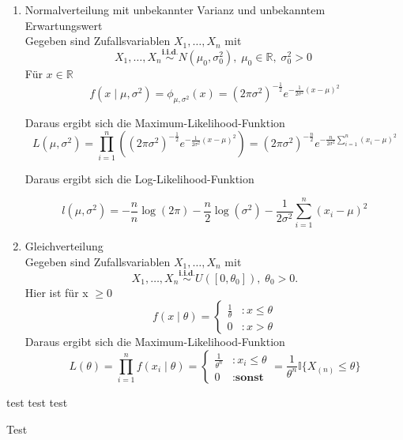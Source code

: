 \documentclass[10pt]{article}
\newcommand{\FZV}{X_1, \ldots, X_n} %
\newcommand{\IR}{\mathbb{R}} %
\newcommand{\xt}{x \mid \theta} %
\begin{document}
\begin{enumerate}[label = (\roman*)]
		
		\item Normalverteilung mit unbekannter Varianz und unbekanntem Erwartungswert\\
		Gegeben sind Zufallsvariablen $\FZV$ mit
		\begin{equation*}
			\FZV \overset{\textbf{i.i.d.}} {\sim} N(\mu_0,\sigma_0^2),\; \mu_0 \in \IR, \; \sigma_0^2 >0 \; 
		\end{equation*} 
		Für $x \in \IR$		
		\begin{equation*}
			f(x \mid \mu, \sigma^2) = \phi_{\mu,\sigma^2}(x)=(2\pi\sigma^2)^{-\frac{1}{2}}e^{-\frac{1}{2\sigma^2}(x-\mu)^2}
		\end{equation*}
		
		Daraus ergibt sich die Maximum-Likelihood-Funktion
		\begin{equation*}
			L(\mu, \sigma^2) = \prod_{i=1}^{n}((2\pi\sigma^2)^{-\frac{1}{2}}e^{-\frac{1}{2\sigma^2}(x-\mu)^2}) = (2\pi\sigma^2)^{-\frac{n}{2}}e^{-\frac{n}{2\sigma^2}\sum_{i=1}^{n}(x_i-\mu)^2}
		\end{equation*}
		
		Daraus ergibt sich die Log-Likelihood-Funktion
		
		\begin{equation*}
			l(\mu, \sigma^2) = -\frac{n}{n}\log(2\pi) - \frac{n}{2}\log(\sigma^2)-\frac{1}{2\sigma^2}\sum_{i=1}^{n}(x_i-\mu)^2
		\end{equation*}
		
		\item Gleichverteilung\\
		Gegeben sind Zufallsvariablen $\FZV$ mit
		\begin{equation*}
			\FZV \overset{\textbf{i.i.d.}}{\sim} U([0,\theta_0]), \; \theta_0 >0.
		\end{equation*}
		Hier ist für x $\geq 0$
		\begin{equation*}
			f(\xt)=\begin{cases}
				\frac{1}{\theta} &: x\leq \theta\\
				0 &: x >\theta
			\end{cases}
		\end{equation*}
		Daraus ergibt sich die Maximum-Likelihood-Funktion
		\begin{equation*}
			L(\theta)=\prod_{i=1}^{n} f(x_i \mid \theta) = \begin{cases}
				\frac{1}{\theta^n} &: x_i\leq \theta\\
				0 &: \textbf{sonst}
			\end{cases} = \frac{1}{\theta^n} \mathbb{I}\{X_{(n)} \leq \theta\}
		\end{equation*}
		
	\end{enumerate}
	

test test test	


Test
	
\end{document}

